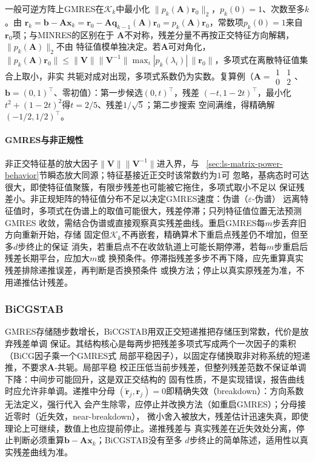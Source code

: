 一般可逆方阵上GMRES在$\mathcal K_k$中最小化
$\lVert p_k(\bm A)\bm r_0\rVert_2$，$p_k(0)=1$、次数至多$k$。由
$\bm r_k=\bm b-\bm A\bm x_k=\bm r_0-\bm A\bm q_{k-1}(\bm A)\bm r_0
=p_k(\bm A)\bm r_0$，常数项$p_k(0)=1$来自$\bm r_0$项；与MINRES的区别在于
$\bm A$不对称，残差分量不再按正交特征方向解耦，$\lVert p_k(\bm A)\rVert_2$不由
特征值模单独决定。若$\bm A$可对角化，
$\lVert p_k(\bm A)\bm r_0\rVert\leq\lVert\bm V\rVert\lVert\bm V^{-1}\rVert
\max_i|p_k(\lambda_i)|\,\lVert\bm r_0\rVert$，多项式在离散特征值集合上取小，非实
共轭对成对出现，多项式系数仍为实数。复算例（$\bm A=\begin{smallmatrix}1&1\\0&2\end{smallmatrix}$、
$\bm b=(0,1)^{\top}$、零初值）：第一步候选$(0,t)^{\top}$，残差
$(-t,1-2t)^{\top}$，最小化$t^2+(1-2t)^2$得$t=2/5$、残差$1/\sqrt5$；第二步搜索
空间满维，得精确解$(-1/2,1/2)^{\top}$。

\paragraph{GMRES与非正规性}

非正交特征基的放大因子$\lVert\bm V\rVert\lVert\bm V^{-1}\rVert$进入界，与
~\ref{sec:ls-matrix-power-behavior}节瞬态放大同源；特征基接近正交时该常数约为$1$可
忽略，基病态时可达很大，即使特征值聚簇，有限步残差也可能被它拖住，多项式取小不足以
保证残差小。非正规矩阵的特征值分布不足以决定GMRES速度：伪谱（$\varepsilon$-伪谱）
远离特征值时，多项式在伪谱上的取值可能很大，残差停滞；只列特征值位置无法预测GMRES
收敛，需结合伪谱或直接观察真实残差曲线。重启GMRES每$m$步丢弃旧方向重新开始，存储
固定但$\mathcal K_k$不再嵌套，精确算术下重启点残差仍不增加，但至多$d$步终止的保证
消失，若重启点不在收敛轨道上可能长期停滞，若每$m$步重启后残差长期平台，应加大$m$或
换预条件。停滞指残差多步不再下降，应先重算真实残差排除递推误差，再判断是否换预条件
或换方法；停止以真实原残差为准，不用递推估计残差。

\subsubsection{BiCGSTAB}

GMRES存储随步数增长，BiCGSTAB用双正交短递推把存储压到常数，代价是放弃残差单调
保证。其结构核心是每两步把残差多项式写成两个一次因子的乘积（BiCG因子乘一个GMRES式
局部平稳因子），以固定存储换取非对称系统的短递推，不要求$\bm A$-共轭。局部平稳
校正压低当前步残差，但整列残差范数不保证单调下降：中间步可能回升，这是双正交结构的
固有性质，不是实现错误，报告曲线时应允许非单调。递推中分母
$(\tilde{\bm r}_j,\bm r_j)=0$即精确失效（breakdown）：方向系数无法定义，强行代入
会产生除零，应停止并改换方法（如重启GMRES）；分母接近零时（近失效，near-breakdown），
微小舍入被放大，残差估计迅速失真，即使理论上可继续，数值上也应提前停止。递推残差与
真实残差在近失效处分离，停止判断必须重算$\bm b-\bm A\bm x_k$；BiCGSTAB没有至多
$d$步终止的简单陈述，适用性以真实残差曲线为准。


